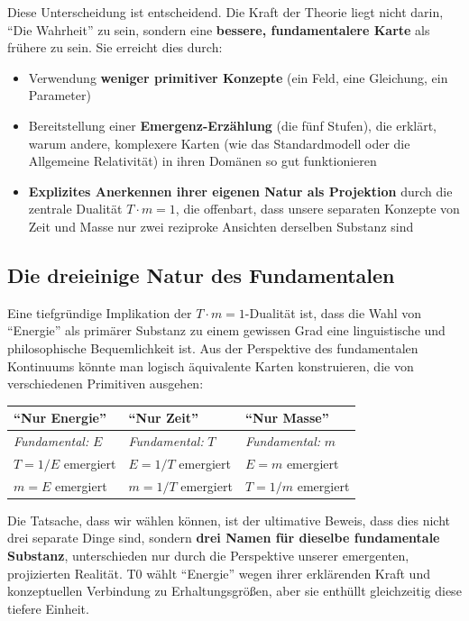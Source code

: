 	Diese Unterscheidung ist entscheidend. Die Kraft der Theorie liegt nicht darin, \enquote{Die Wahrheit} zu sein, sondern eine \textbf{bessere, fundamentalere Karte} als frühere zu sein. Sie erreicht dies durch:
	\begin{itemize}
		\item Verwendung \textbf{weniger primitiver Konzepte} (ein Feld, eine Gleichung, ein Parameter)
		\item Bereitstellung einer \textbf{Emergenz-Erzählung} (die fünf Stufen), die erklärt, warum andere, komplexere Karten (wie das Standardmodell oder die Allgemeine Relativität) in ihren Domänen so gut funktionieren
		\item \textbf{Explizites Anerkennen ihrer eigenen Natur als Projektion} durch die zentrale Dualität $T \cdot m = 1$, die offenbart, dass unsere separaten Konzepte von Zeit und Masse nur zwei reziproke Ansichten derselben Substanz sind
	\end{itemize}
	
	\subsection{Die dreieinige Natur des Fundamentalen}
	
	Eine tiefgründige Implikation der $T \cdot m = 1$-Dualität ist, dass die Wahl von \enquote{Energie} als primärer Substanz zu einem gewissen Grad eine linguistische und philosophische Bequemlichkeit ist. Aus der Perspektive des fundamentalen Kontinuums könnte man logisch äquivalente Karten konstruieren, die von verschiedenen Primitiven ausgehen:
	
	\begin{center}
		\begin{tabular}{p{} p{} p{}}
			\toprule
			\textbf{\enquote{Nur Energie}} & \textbf{\enquote{Nur Zeit}} & \textbf{\enquote{Nur Masse}} \\
			\midrule
			\textit{Fundamental: } $E$ & \textit{Fundamental: } $T$ & \textit{Fundamental: } $m$ \\
			$T = 1/E$ emergiert & $E = 1/T$ emergiert & $E = m$ emergiert \\
			$m = E$ emergiert & $m = 1/T$ emergiert & $T = 1/m$ emergiert \\
			\bottomrule
		\end{tabular}
	\end{center}
	
	Die Tatsache, dass wir wählen können, ist der ultimative Beweis, dass dies nicht drei separate Dinge sind, sondern \textbf{drei Namen für dieselbe fundamentale Substanz}, unterschieden nur durch die Perspektive unserer emergenten, projizierten Realität. T0 wählt \enquote{Energie} wegen ihrer erklärenden Kraft und konzeptuellen Verbindung zu Erhaltungsgrößen, aber sie enthüllt gleichzeitig diese tiefere Einheit.
	
